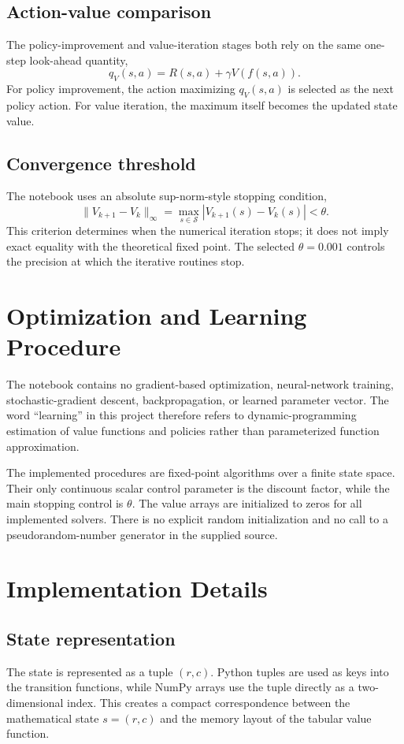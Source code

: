 \documentclass[11pt,a4paper]{article}
\begin{document}
\subsection{Action-value comparison}
The policy-improvement and value-iteration stages both rely on the same one-step look-ahead quantity,
\begin{equation}
q_V(s,a)
=R(s,a)+\gamma V(f(s,a)).
\end{equation}
For policy improvement, the action maximizing \(q_V(s,a)\) is selected as the next policy action. For value iteration, the maximum itself becomes the updated state value.

\subsection{Convergence threshold}
The notebook uses an absolute sup-norm-style stopping condition,
\begin{equation}
\|V_{k+1}-V_k\|_\infty
=\max_{s\in\mathcal{S}}|V_{k+1}(s)-V_k(s)|
<\theta.
\end{equation}
This criterion determines when the numerical iteration stops; it does not imply exact equality with the theoretical fixed point. The selected \(\theta=0.001\) controls the precision at which the iterative routines stop.

\section{Optimization and Learning Procedure}
The notebook contains no gradient-based optimization, neural-network training, stochastic-gradient descent, backpropagation, or learned parameter vector. The word ``learning'' in this project therefore refers to dynamic-programming estimation of value functions and policies rather than parameterized function approximation.

The implemented procedures are fixed-point algorithms over a finite state space. Their only continuous scalar control parameter is the discount factor, while the main stopping control is \(\theta\). The value arrays are initialized to zeros for all implemented solvers. There is no explicit random initialization and no call to a pseudorandom-number generator in the supplied source.

\section{Implementation Details}
\subsection{State representation}
The state is represented as a tuple \((r,c)\). Python tuples are used as keys into the transition functions, while NumPy arrays use the tuple directly as a two-dimensional index. This creates a compact correspondence between the mathematical state \(s=(r,c)\) and the memory layout of the tabular value function.
\end{document}
